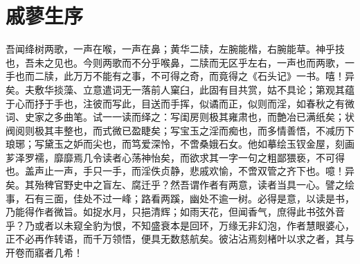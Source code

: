 \chapter*{戚蓼生序}

\begin{qute2sp}

    \begin{parag}
        \large
        吾闻绛树两歌，一声在喉，一声在鼻；黄华二牍，左腕能楷，右腕能草。神乎技也，吾未之见也。今则两歌而不分乎喉鼻，二牍而无区乎左右，一声也而两歌，一手也而二牍，此万万不能有之事，不可得之奇，而竟得之《石头记》一书。嘻！异矣。夫敷华掞藻、立意遣词无一落前人窠臼，此固有目共赏，姑不具论；第观其蕴于心而抒于手也，注彼而写此，目送而手挥，似谲而正，似则而淫，如春秋之有微词、史家之多曲笔。试一一读而绎之：写闺房则极其雍肃也，而艶冶已满纸矣；状阀阅则极其丰整也，而式微已盈睫矣；写宝玉之淫而痴也，而多情善悟，不减历下琅琊；写黛玉之妒而尖也，而笃爱深怜，不啻桑娥石女。他如摹绘玉钗金屋，刻画芗泽罗襦，靡靡焉几令读者心荡神怡矣，而欲求其一字一句之粗鄙猥亵，不可得也。盖声止一声，手只一手，而淫佚贞静，悲戚欢愉，不啻双管之齐下也。噫！异矣。其殆稗官野史中之盲左、腐迁乎？然吾谓作者有两意，读者当具一心。譬之绘事，石有三面，佳处不过一峰；路看两蹊，幽处不逾一树。必得是意，以读是书，乃能得作者微旨。如捉水月，只挹清辉；如雨天花，但闻香气，庶得此书弦外音乎？乃或者以未窥全豹为恨，不知盛衰本是回环，万缘无非幻泡，作者慧眼婆心，正不必再作转语，而千万领悟，便具无数慈航矣。彼沾沾焉刻楮叶以求之者，其与开卷而寤者几希！
    \end{parag}

\end{qute2sp}

